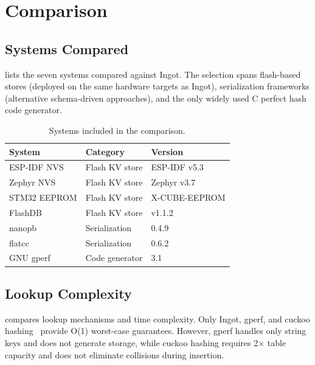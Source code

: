 \documentclass[10pt,twocolumn,letterpaper]{article}
\begin{document}
\section{Comparison}
\label{sec:comparison}

\subsection{Systems Compared}

 lists the seven systems compared against Ingot.
The selection spans flash-based stores (deployed on the same hardware
targets as Ingot), serialization frameworks (alternative schema-driven
approaches), and the only widely used C perfect hash code generator.

\begin{table}[t]
\centering
\footnotesize
\begin{tabular}{@{}lll@{}}
\toprule
\textbf{System} & \textbf{Category} & \textbf{Version} \\
\midrule
ESP-IDF NVS & Flash KV store & ESP-IDF v5.3 \\
Zephyr NVS & Flash KV store & Zephyr v3.7 \\
STM32 EEPROM & Flash KV store & X-CUBE-EEPROM \\
FlashDB & Flash KV store & v1.1.2 \\
nanopb & Serialization & 0.4.9 \\
flatcc & Serialization & 0.6.2 \\
GNU gperf & Code generator & 3.1 \\
\bottomrule
\end{tabular}
\caption{Systems included in the comparison.}
\label{tab:systems}
\end{table}

\subsection{Lookup Complexity}

 compares lookup mechanisms and time complexity.
Only Ingot, gperf, and cuckoo hashing~\cite{cuckoo-hashing} provide
O(1) worst-case guarantees.  However, gperf handles only string keys
and does not generate storage, while cuckoo hashing requires 2$\times$
table capacity and does not eliminate collisions during insertion.
\end{document}
